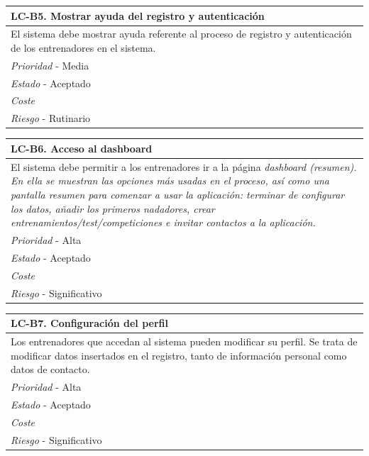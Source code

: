 	\begin{center}
		\begin{tabularx}{15cm}{|X|}
			\hline 
				\bf{LC-B5. Mostrar ayuda del registro y autenticación}\\
			\hline
				El sistema debe mostrar ayuda referente al proceso de registro y autenticación de los entrenadores en el sistema.\\
			\hline
				{\it Prioridad} - Media\\
			\hline
				{\it Estado} - Aceptado\\
			\hline
				{\it Coste}\\
			\hline
				{\it Riesgo} - Rutinario\\
			\hline
		\end{tabularx}
	\end{center}
	
	\begin{center}
		\begin{tabularx}{15cm}{|X|}
			\hline 
				\bf{LC-B6. Acceso al dashboard}\\
			\hline
				El sistema debe permitir a los entrenadores ir a la página \it{dashboard} (resumen). En ella se muestran las opciones más usadas en el proceso, así como una pantalla resumen para comenzar a usar la aplicación: terminar de configurar los datos, añadir los primeros nadadores, crear entrenamientos/test/competiciones e invitar contactos a la aplicación.\\
			\hline
				{\it Prioridad} - Alta\\
			\hline
				{\it Estado} - Aceptado\\
			\hline
				{\it Coste}\\
			\hline
				{\it Riesgo} - Significativo\\
			\hline
		\end{tabularx}
	\end{center}
	
	\begin{center}
		\begin{tabularx}{15cm}{|X|}
			\hline 
				\bf{LC-B7. Configuración del perfil}\\
			\hline
				Los entrenadores que accedan al sistema pueden modificar su perfil. Se trata de modificar datos insertados en el registro, tanto de información personal como datos de contacto.\\
			\hline
				{\it Prioridad} - Alta\\
			\hline
				{\it Estado} - Aceptado\\
			\hline
				{\it Coste}\\
			\hline
				{\it Riesgo} - Significativo\\
			\hline
		\end{tabularx}
	\end{center}
	
